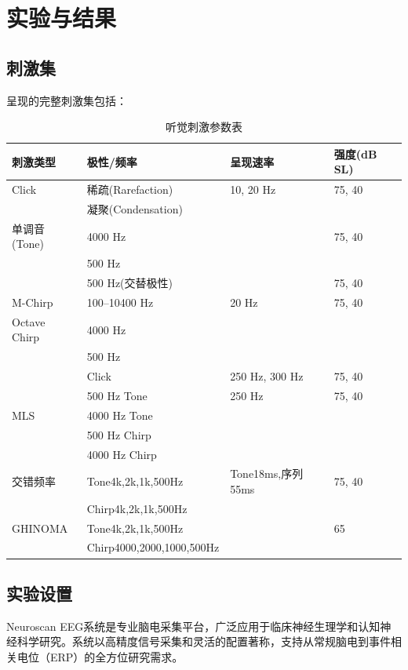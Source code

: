 \section{实验与结果}
\subsection*{刺激集}
呈现的完整刺激集包括：
\begin{table}[H]
\centering
\caption{听觉刺激参数表}
\label{tab:stimulus_params}
\begin{tabular}{llll}
\toprule
\textbf{刺激类型} & \textbf{极性/频率} & \textbf{呈现速率} & \textbf{强度(dB SL)} \\
\midrule
\hline
Click & 稀疏(Rarefaction) & 10, 20 Hz & 75, 40 \\
     & 凝聚(Condensation) &          &   \\
\hline
单调音(Tone) & 4000 Hz  &       & 75, 40 \\
            & 500 Hz              &       & \\
            & 500 Hz(交替极性)    &       & 75, 40 \\
\hline
M-Chirp & 100–10400 Hz & 20 Hz & 75, 40 \\
\hline
Octave Chirp & 4000 Hz &       &           \\
                      & 500 Hz  &       &           \\
\hline
\multirow{5}{*}{MLS} & Click        & 250 Hz, 300 Hz & 75, 40 \\
                                   & 500 Hz Tone   & 250 Hz         & 75, 40 \\
                                   & 4000 Hz Tone  &   &  \\
                                   & 500 Hz Chirp   &    &  \\
                                   & 4000 Hz Chirp  &    &  \\
\hline
交错频率 & Tone4k,2k,1k,500Hz& Tone18ms,序列55ms & 75, 40 \\
        & Chirp4k,2k,1k,500Hz& &    \\
\hline
GHINOMA & Tone4k,2k,1k,500Hz&       & 65 \\
        & Chirp4000,2000,1000,500Hz &       &   \\
\bottomrule
\end{tabular}
\end{table}

\subsection*{实验设置}
Neuroscan EEG系统是专业脑电采集平台，广泛应用于临床神经生理学和认知神经科学研究。系统以高精度信号采集和灵活的配置著称，支持从常规脑电到事件相关电位（ERP）的全方位研究需求。

